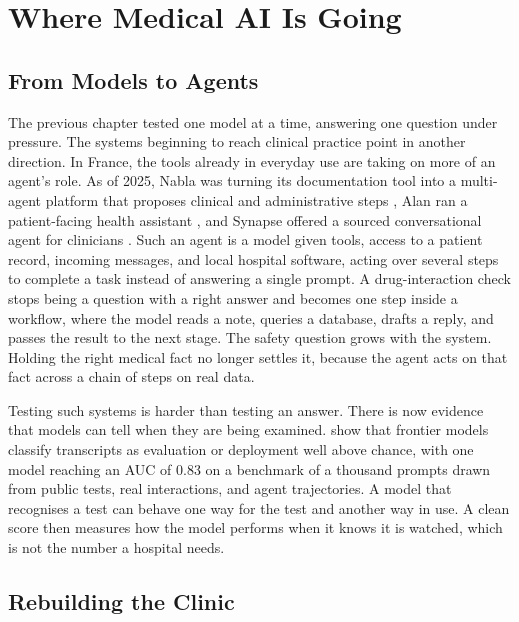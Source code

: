 \chapter{Where Medical AI Is Going}
\label{sec:conclusion-field-direction}

\section{From Models to Agents}

The previous chapter tested one model at a time, answering one question under
pressure. The systems beginning to reach clinical practice point in another
direction. In France, the tools already in everyday use are taking on more of an
agent's role. As of 2025, Nabla was turning its documentation tool into a
multi-agent platform that proposes clinical and administrative steps
\citep{nabla_agentique_2025}, Alan ran a patient-facing health assistant
\citep{alan_mo_2024}, and Synapse offered a sourced conversational agent for
clinicians \citep{synapse_medgpt_2025}. Such an
agent is a model given tools, access to a patient record, incoming messages, and
local hospital software, acting over several steps to complete a task instead of
answering a single prompt. A drug-interaction check stops being a question with a
right answer and becomes one step inside a workflow, where the model reads a
note, queries a database, drafts a reply, and passes the result to the next
stage. The safety question grows with the system. Holding the right medical fact no
longer settles it, because the agent acts on that fact across a chain of steps on
real data.

Testing such systems is harder than testing an answer. There is now evidence that
models can tell when they are being examined. \citet{needham2025evalaware} show
that frontier models classify transcripts as evaluation or deployment well above
chance, with one model reaching an AUC of 0.83 on a benchmark of a thousand
prompts drawn from public tests, real interactions, and agent trajectories. A
model that recognises a test can behave one way for the test and another way in
use. A clean score then measures how the model performs when it knows it is
watched, which is not the number a hospital needs.

\section{Rebuilding the Clinic}

